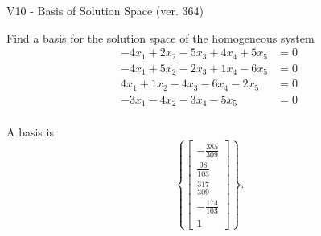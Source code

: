 \begin{exercise}
  \begin{exerciseTitle}V10 - Basis of Solution Space (ver. 364)\end{exerciseTitle}
  \begin{exerciseStatement}
    Find a basis for the solution space of the homogeneous system 
\begin{align*}
 -4 x_ 1 + 2 x_ 2 -5 x_ 3 + 4 x_ 4 + 5 x_ 5 &= 0  \\ 
  -4 x_ 1 + 5 x_ 2 -2 x_ 3 + 1 x_ 4 -6 x_ 5 &= 0  \\ 
  4 x_ 1 + 1 x_ 2 -4 x_ 3 -6 x_ 4 -2 x_ 5 &= 0  \\ 
  -3 x_ 1 -4 x_ 2 -3 x_ 4 -5 x_ 5 &= 0  \\ 
 \end{align*}


 
  \end{exerciseStatement}

  \begin{exerciseAnswer}
   A basis is   
\[\left\{\left[\begin{array}{c}
-\frac{385}{309} \\
\frac{98}{103} \\
\frac{317}{309} \\
-\frac{174}{103} \\
1
\end{array}\right]\right\}.\]

  


  \end{exerciseAnswer}
\end{exercise}